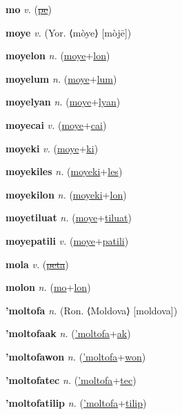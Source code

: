 \textbf{\hypertarget{mo}{mo}} \textit{v.} (\hyperlink{pe}{\sout{pe}})


\textbf{\hypertarget{moye}{moye}} \textit{v.} (Yor. ⟨mòye⟩ [mòjē])


\textbf{\hypertarget{moyelon}{moyelon}} \textit{n.} (\hyperlink{moye}{moye}+\allowbreak \hyperlink{lon}{lon})


\textbf{\hypertarget{moyelum}{moyelum}} \textit{n.} (\hyperlink{moye}{moye}+\allowbreak \hyperlink{lum}{lum})


\textbf{\hypertarget{moyelyan}{moyelyan}} \textit{n.} (\hyperlink{moye}{moye}+\allowbreak \hyperlink{lyan}{lyan})


\textbf{\hypertarget{moyecai}{moyecai}} \textit{v.} (\hyperlink{moye}{moye}+\allowbreak \hyperlink{cai}{cai})


\textbf{\hypertarget{moyeki}{moyeki}} \textit{v.} (\hyperlink{moye}{moye}+\allowbreak \hyperlink{ki}{ki})


\textbf{\hypertarget{moyekiles}{moyekiles}} \textit{n.} (\hyperlink{moyeki}{moyeki}+\allowbreak \hyperlink{les}{les})


\textbf{\hypertarget{moyekilon}{moyekilon}} \textit{n.} (\hyperlink{moyeki}{moyeki}+\allowbreak \hyperlink{lon}{lon})


\textbf{\hypertarget{moyetiluat}{moyetiluat}} \textit{n.} (\hyperlink{moye}{moye}+\allowbreak \hyperlink{tiluat}{tiluat})


\textbf{\hypertarget{moyepatili}{moyepatili}} \textit{v.} (\hyperlink{moye}{moye}+\allowbreak \hyperlink{patili}{patili})


\textbf{\hypertarget{mola}{mola}} \textit{v.} (\hyperlink{peta}{\sout{peta}})


\textbf{\hypertarget{molon}{molon}} \textit{n.} (\hyperlink{mo}{mo}+\allowbreak \hyperlink{lon}{lon})


\textbf{\hypertarget{'moltofa}{'moltofa}} \textit{n.} (Ron. ⟨Moldova⟩ [moldova])


\textbf{\hypertarget{'moltofaak}{'moltofaak}} \textit{n.} (\hyperlink{'moltofa}{'moltofa}+\allowbreak \hyperlink{ak}{ak})


\textbf{\hypertarget{'moltofawon}{'moltofawon}} \textit{n.} (\hyperlink{'moltofa}{'moltofa}+\allowbreak \hyperlink{won}{won})


\textbf{\hypertarget{'moltofatec}{'moltofatec}} \textit{n.} (\hyperlink{'moltofa}{'moltofa}+\allowbreak \hyperlink{tec}{tec})


\textbf{\hypertarget{'moltofatilip}{'moltofatilip}} \textit{n.} (\hyperlink{'moltofa}{'moltofa}+\allowbreak \hyperlink{tilip}{tilip})



